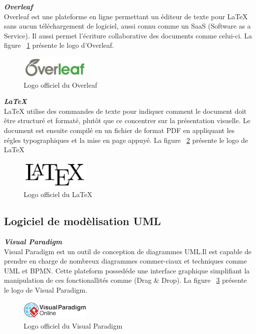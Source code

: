 \noindent
{\small\textbf{\textit{Overleaf}}}\mbox{}\\
Overleaf est une plateforme en ligne permettant un éditeur de texte pour LaTeX sans aucun téléchargement de logiciel, aussi connu comme un SaaS (Software as a Service). Il aussi permet l'écriture collaborative des documents comme celui-ci.
La figure ~\ref{fig:overleaf} présente le logo d'Overleaf.
\begin{figure}[H]
\centering
\includegraphics[width=0.3\textwidth]{logos/overleaf.png}
\caption{Logo officiel du Overleaf}
\label{fig:overleaf}
\end{figure}

\noindent
{\small\textbf{\textit{LaTeX}}}\mbox{}\\
LaTeX utilise des commandes de texte pour indiquer comment le document doit être structuré et formaté, plutôt que ce concentrer sur la présentation visuelle. Le document est ensuite compilé en un fichier de format PDF en appliquant les régles typographiques et la mise en page appuyé. La figure ~\ref{fig:latex} présente le logo de LaTeX
\begin{figure}[H]
\centering
\includegraphics[width=0.3\textwidth]{logos/latex.png}
\caption{Logo officiel du LaTeX}
\label{fig:latex}
\end{figure}

\subsection{Logiciel de modèlisation UML}
\noindent
{\small\textbf{\textit{Visual Paradigm}}}\mbox{}\\
Visual Paradigm est un outil de conception de diagrammes UML.Il est capable de prendre en charge de nombreux diagrammes commer-ciaux et techniques comme UML et BPMN. Cette plateform possedéde une interface graphique simplifiant la manipulation de ces fonctionallités comme (Drag \& Drop). La figure ~\ref{fig:vp} présente le logo de Visual Paradigm.

\begin{figure}[H]
\centering
\includegraphics[width=0.3\textwidth]{logos/vp.png}
\caption{Logo officiel du Visual Paradigm}
\label{fig:vp}
\end{figure}


